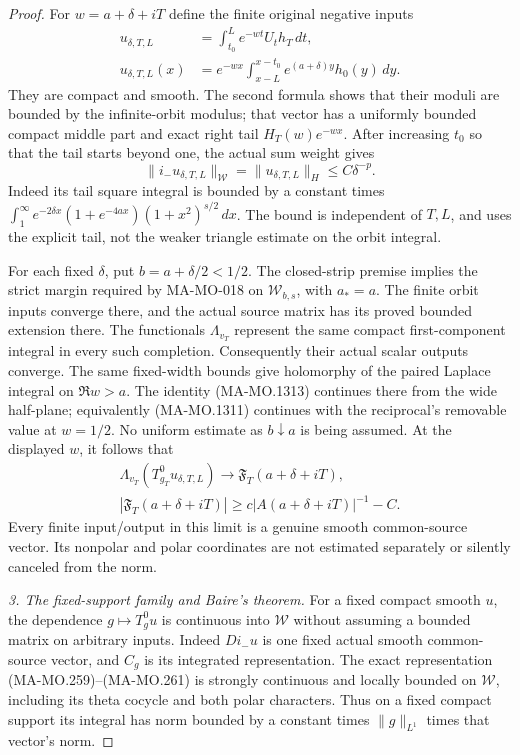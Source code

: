 \begin{proof}
For $w=a+\delta+iT$ define the finite original negative inputs
\[
 \begin{aligned}
 u_{\delta,T,L}&=\int_{t_0}^L e^{-wt}U_th_T\,dt,\\
 u_{\delta,T,L}(x)
      &=e^{-wx}\int_{x-L}^{x-t_0}e^{(a+\delta)y}h_0(y)\,dy.
 \end{aligned}
 \tag{MA-MO.1314}
\]
They are compact and smooth.  The second formula shows that
their moduli are bounded by the infinite-orbit modulus; that
vector has a uniformly bounded compact middle part and exact
right tail $H_T(w)e^{-wx}$.  After increasing $t_0$ so that
the tail starts beyond one, the actual sum weight gives
\[
 \|i_-u_{\delta,T,L}\|_{\mathcal W}
       =\|u_{\delta,T,L}\|_H\le C\delta^{-p}.
 \tag{MA-MO.1315}
\]
Indeed its tail square integral is bounded by a constant times
$\int_1^\infty e^{-2\delta x}(1+e^{-4ax})(1+x^2)^{s/2}\,dx$.
The bound is independent of $T,L$, and uses the explicit tail,
not the weaker triangle estimate on the orbit integral.

For each fixed $\delta$, put $b=a+\delta/2<1/2$.
The closed-strip premise implies the strict margin required by
MA-MO-018 on $\mathcal W_{b,s}$, with $a_*=a$.
The finite orbit inputs converge there, and the actual source
matrix has its proved bounded extension there.  The functionals
$\Lambda_{v_T}$ represent the same compact first-component
integral in every such completion.  Consequently their actual
scalar outputs converge.  The same fixed-width bounds give
holomorphy of the paired Laplace integral on $\Re w>a$.
The identity (MA-MO.1313) continues there from the wide half-plane;
equivalently (MA-MO.1311) continues with the reciprocal's
removable value at $w=1/2$.
No uniform estimate as $b\downarrow a$ is being assumed.
At the displayed $w$, it follows that
\[
 \begin{gathered}
 \Lambda_{v_T}(T_{g_T}^0u_{\delta,T,L})\longrightarrow
                  \mathfrak F_T(a+\delta+iT),\\
 |\mathfrak F_T(a+\delta+iT)|
                  \ge c|A(a+\delta+iT)|^{-1}-C.
 \end{gathered}
 \tag{MA-MO.1316}
\]
Every finite input/output in this limit is a genuine smooth
common-source vector.  Its nonpolar and polar coordinates are
not estimated separately or silently canceled from the norm.

\emph{3. The fixed-support family and Baire's theorem.}
For a fixed compact smooth $u$, the dependence
$g\mapsto T_g^0u$ is continuous into $\mathcal W$ without
assuming a bounded matrix on arbitrary inputs.
Indeed $D i_-u$ is one fixed actual smooth common-source vector,
and $C_g$ is its integrated representation.
The exact representation (MA-MO.259)--(MA-MO.261) is strongly
continuous and locally bounded on $\mathcal W$, including
its theta cocycle and both polar characters.  Thus on a fixed
compact support its integral has norm bounded by a constant
times $\|g\|_{L^1}$ times that vector's norm.


\end{proof}
